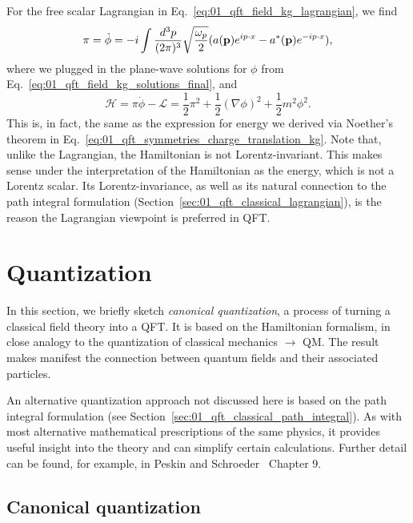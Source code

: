 For the free scalar Lagrangian in Eq.~\ref{eq:01_qft_field_kg_lagrangian}, we find
\begin{equation}
	\label{eq:01_qft_hamiltonian_kg_momenta}
    \pi = \dot\phi = -i \int \frac{d^3p}{(2\pi)^3} \sqrt{\frac{\omega_p}{2}} (a(\mathbf{p})e^{ip\cdot x} - a^*(\mathbf{p})e^{-ip\cdot x}),
\end{equation}
where we plugged in the plane-wave solutions for $\phi$ from Eq.~\ref{eq:01_qft_field_kg_solutions_final}, and
\begin{equation}
    \label{eq:01_qft_hamiltonian_kg}
    \mathcal H = \pi\dot\phi - \mathcal L = \frac{1}{2}\pi^2 + \frac{1}{2}(\nabla\phi)^2 + \frac{1}{2}m^2\phi^2.
\end{equation}
This is, in fact, the same as the expression for energy we derived via Noether's theorem in Eq.~\ref{eq:01_qft_symmetries_charge_translation_kg}.
Note that, unlike the Lagrangian, the Hamiltonian is not Lorentz-invariant.
This makes sense under the interpretation of the Hamiltonian as the energy, which is not a Lorentz scalar.
Its Lorentz-invariance, as well as its natural connection to the path integral formulation (Section~\ref{sec:01_qft_classical_lagrangian}), is the reason the Lagrangian viewpoint is preferred in QFT.


\section{Quantization}
\label{sec:01_qft_quantization}

In this section, we briefly sketch \textit{canonical quantization}, a process of turning a classical field theory into a QFT.
It is based on the Hamiltonian formalism, in close analogy to the quantization of classical mechanics $\rightarrow$ QM.
The result makes manifest the connection between quantum fields and their associated particles.

An alternative quantization approach not discussed here is based on the path integral formulation (see Section~\ref{sec:01_qft_classical_path_integral}).
As with most alternative mathematical prescriptions of the same physics, it provides useful insight into the theory and can simplify certain calculations.
Further detail can be found, for example, in Peskin and Schroeder~\cite{Peskin:1995ev} Chapter 9.

\subsection{Canonical quantization}


